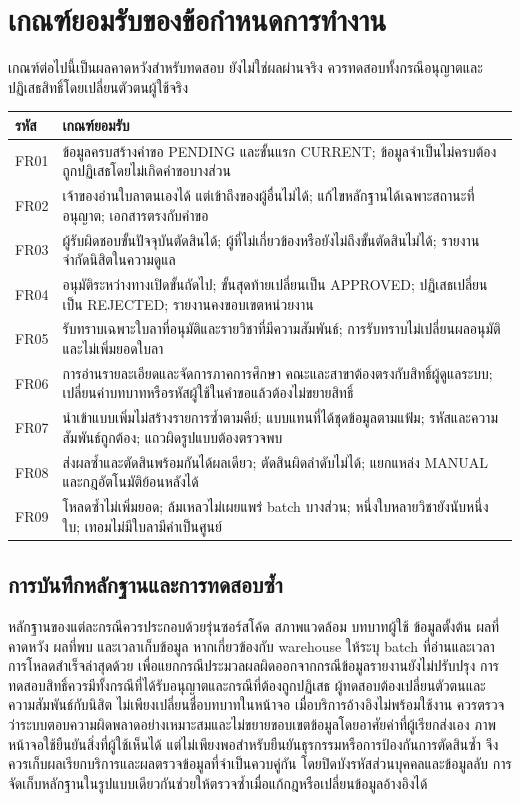 \section{เกณฑ์ยอมรับของข้อกำหนดการทำงาน}
เกณฑ์ต่อไปนี้เป็นผลคาดหวังสำหรับทดสอบ ยังไม่ใช่ผลผ่านจริง
ควรทดสอบทั้งกรณีอนุญาตและปฏิเสธสิทธิ์โดยเปลี่ยนตัวตนผู้ใช้จริง
\begin{tabularx}{\textwidth}{|p{16mm}|X|}
  \hline
  รหัส & เกณฑ์ยอมรับ \\ \hline
  FR01 & ข้อมูลครบสร้างคำขอ PENDING และขั้นแรก CURRENT;
  ข้อมูลจำเป็นไม่ครบต้องถูกปฏิเสธโดยไม่เกิดคำขอบางส่วน \\ \hline
  FR02 & เจ้าของอ่านใบลาตนเองได้ แต่เข้าถึงของผู้อื่นไม่ได้;
  แก้ไขหลักฐานได้เฉพาะสถานะที่อนุญาต; เอกสารตรงกับคำขอ \\ \hline
  FR03 & ผู้รับผิดชอบขั้นปัจจุบันตัดสินได้;
  ผู้ที่ไม่เกี่ยวข้องหรือยังไม่ถึงขั้นตัดสินไม่ได้;
  รายงานจำกัดนิสิตในความดูแล \\ \hline
  FR04 & อนุมัติระหว่างทางเปิดขั้นถัดไป; ขั้นสุดท้ายเปลี่ยนเป็น
  APPROVED; ปฏิเสธเปลี่ยนเป็น REJECTED; รายงานคงขอบเขตหน่วยงาน \\ \hline
  FR05 & รับทราบเฉพาะใบลาที่อนุมัติและรายวิชาที่มีความสัมพันธ์;
  การรับทราบไม่เปลี่ยนผลอนุมัติและไม่เพิ่มยอดใบลา \\ \hline
  FR06 & การอ่านรายละเอียดและจัดการภาคการศึกษา
  คณะและสาขาต้องตรงกับสิทธิ์ผู้ดูแลระบบ;
  เปลี่ยนค่าบทบาทหรือรหัสผู้ใช้ในคำขอแล้วต้องไม่ขยายสิทธิ์ \\ \hline
  FR07 & นำเข้าแบบเพิ่มไม่สร้างรายการซ้ำตามคีย์;
  แบบแทนที่ได้ชุดข้อมูลตามแฟ้ม; รหัสและความสัมพันธ์ถูกต้อง;
  แถวผิดรูปแบบต้องตรวจพบ \\ \hline
  FR08 & ส่งผลซ้ำและตัดสินพร้อมกันได้ผลเดียว; ตัดสินผิดลำดับไม่ได้;
  แยกแหล่ง MANUAL และกฎอัตโนมัติย้อนหลังได้ \\ \hline
  FR09 & โหลดซ้ำไม่เพิ่มยอด; ล้มเหลวไม่เผยแพร่ batch บางส่วน;
  หนึ่งใบหลายวิชายังนับหนึ่งใบ; เทอมไม่มีใบลามีค่าเป็นศูนย์ \\ \hline
\end{tabularx}
\subsection{การบันทึกหลักฐานและการทดสอบซ้ำ}
หลักฐานของแต่ละกรณีควรประกอบด้วยรุ่นซอร์สโค้ด สภาพแวดล้อม บทบาทผู้ใช้
ข้อมูลตั้งต้น ผลที่คาดหวัง ผลที่พบ และเวลาเก็บข้อมูล หากเกี่ยวข้องกับ
warehouse ให้ระบุ batch ที่อ่านและเวลาการโหลดสำเร็จล่าสุดด้วย
เพื่อแยกกรณีประมวลผลผิดออกจากกรณีข้อมูลรายงานยังไม่ปรับปรุง
การทดสอบสิทธิ์ควรมีทั้งกรณีที่ได้รับอนุญาตและกรณีที่ต้องถูกปฏิเสธ
ผู้ทดสอบต้องเปลี่ยนตัวตนและความสัมพันธ์กับนิสิต
ไม่เพียงเปลี่ยนชื่อบทบาทในหน้าจอ เมื่อบริการอ้างอิงไม่พร้อมใช้งาน
ควรตรวจว่าระบบตอบความผิดพลาดอย่างเหมาะสมและไม่ขยายขอบเขตข้อมูลโดยอาศัยค่าที่ผู้เรียกส่งเอง
ภาพหน้าจอใช้ยืนยันสิ่งที่ผู้ใช้เห็นได้
แต่ไม่เพียงพอสำหรับยืนยันธุรกรรมหรือการป้องกันการตัดสินซ้ำ
จึงควรเก็บผลเรียกบริการและผลตรวจข้อมูลที่จำเป็นควบคู่กัน
โดยปิดบังรหัสส่วนบุคคลและข้อมูลลับ
การจัดเก็บหลักฐานในรูปแบบเดียวกันช่วยให้ตรวจซ้ำเมื่อแก้กฎหรือเปลี่ยนข้อมูลอ้างอิงได้
